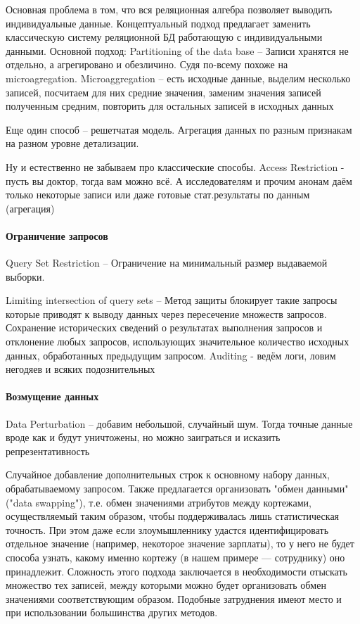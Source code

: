 Основная проблема в том, что вся реляционная алгебра позволяет выводить индивидуальные данные. Концептуальный подход предлагает заменить классическую систему реляционной БД работающую с индивидуальными данными.
Основной подход:
Partitioning of the data base -- Записи хранятся не отдельно, а агрегировано и обезличино. Судя по-всему похоже на microagregation.
Microaggregation -- есть исходные данные, выделим несколько записей, посчитаем для них средние значения, заменим значения записей полученным средним, повторить для остальных записей в исходных данных

Еще один способ -- решетчатая модель. Агрегация данных по разным признакам на разном уровне детализации.

Ну и естественно не забываем про классические способы.
Access Restriction - пусть вы доктор, тогда вам можно всё. А исследователям и прочим анонам даём только некоторые записи или даже готовые стат.результаты по данным (агрегация)

\paragraph{Ограничение запросов}

Query Set Restriction -- Ограничение на минимальный размер выдаваемой выборки.

Limiting intersection of query sets --  Метод защиты блокирует такие запросы которые приводят к выводу данных через пересечение множеств запросов.
Сохранение исторических сведений о результатах выполнения запросов и отклонение любых запросов, использующих значительное количество исходных данных, обработанных предыдущим запросом.
Auditing - ведём логи, ловим негодяев и всяких подознительных

\paragraph{Возмущение данных}

Data Perturbation -- добавим небольшой, случайный шум. Тогда точные данные вроде как и будут уничтожены, но можно заиграться и исказить репрезентативность

Случайное добавление дополнительных строк к основному набору данных, обрабатываемому запросом.
Также предлагается организовать "обмен данными" ("data swapping"), т.е. обмен значениями атрибутов между кортежами, осуществляемый таким образом, чтобы поддерживалась лишь статистическая точность. При этом даже если злоумышленнику удастся идентифицировать отдельное значение (например, некоторое значение зарплаты), то у него не будет способа узнать, какому именно кортежу (в нашем примере — сотруднику) оно принадлежит. Сложность этого подхода заключается в необходимости отыскать множество тех записей, между которыми можно будет организовать обмен значениями соответствующим образом. Подобные затруднения имеют место и при использовании большинства других методов.

